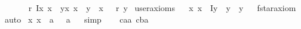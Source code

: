 \begin{isabellebody}
\ \ \isactrlbold {\isasymrightarrow}\ \isanewline
\ \ {\isacharparenleft}{\isacharparenleft}{\isasymalpha}\ \isactrlbold r\ {\isacharparenleft}\isactrlbold Ix{\isachardot}\ {\isasymPhi}{\isacharparenleft}x{\isacharparenright}{\isacharparenright}{\isacharparenright}\ \isactrlbold {\isasymleftrightarrow}\ {\isacharparenleft}\isactrlbold {\isasymexists}y{\isachardot}{\isacharparenleft}{\isacharparenleft}\isactrlbold {\isasymforall}x{\isachardot}\ {\isacharparenleft}{\isacharparenleft}x\ \isactrlbold {\isacharequal}\ y{\isacharparenright}\ \isactrlbold {\isasymleftrightarrow}\ {\isasymPhi}{\isacharparenleft}x{\isacharparenright}{\isacharparenright}{\isacharparenright}\ \isactrlbold {\isasymand}\ {\isacharparenleft}{\isasymalpha}\ \isactrlbold r\ y{\isacharparenright}{\isacharparenright}{\isacharparenright}{\isacharparenright}{\isachardoublequoteclose}\isanewline
{}\isamarkupfalse%
\ {\isacharbrackleft}user{\isacharunderscore}axioms{\isacharbrackright}%
\isadelimproof
\ %
\endisadelimproof
%
\isatagproof
{}\isamarkupfalse%
%
\endisatagproof
{\isafoldproof}%
%
\isadelimproof
%
\endisadelimproof
\isanewline
\isanewline
\isanewline
\isanewline
\isanewline
{}\isamarkupfalse%
\ {\isachardoublequoteopen}\isactrlbold {\isasymnot}{\isacharparenleft}\isactrlbold {\isasymexists}x{\isachardot}\ {\isacharparenleft}x\ \isactrlbold {\isacharequal}\ {\isacharparenleft}\isactrlbold Iy{\isachardot}\ \isactrlbold {\isasymnot}\ {\isacharparenleft}y\ \isactrlbold {\isacharequal}\ y{\isacharparenright}{\isacharparenright}{\isacharparenright}{\isacharparenright}{\isachardoublequoteclose}%
\isadelimproof
\ %
\endisadelimproof
%
\isatagproof
{}\isamarkupfalse%
\ f{\isacharunderscore}star{\isacharunderscore}axiom\ \isamarkupfalse%
\ auto%
\endisatagproof
{\isafoldproof}%
%
\isadelimproof
%
\endisadelimproof
\isanewline
{}\isamarkupfalse%
\ {\isachardoublequoteopen}{\isacharparenleft}\isactrlbold {\isasymexists}x{\isachardot}\ x\ \isactrlbold {\isacharequal}\ a{\isacharparenright}\ \isactrlbold {\isasymrightarrow}\ \ {\isasymA}{\isacharparenleft}a{\isacharparenright}{\isachardoublequoteclose}%
\isadelimproof
\ %
\endisadelimproof
%
\isatagproof
{}\isamarkupfalse%
\ simp%
\endisatagproof
{\isafoldproof}%
%
\isadelimproof
%
\endisadelimproof
\isanewline
\isanewline
\isanewline
\ \ \isanewline
{}\isamarkupfalse%
\ ca{\isacharcolon}{\isacharcolon}{\isacharprime}a\ cb{\isacharcolon}{\isacharcolon}{\isacharprime}a\ \isanewline
{}\isamarkupfalse%

\end{isabellebody}
